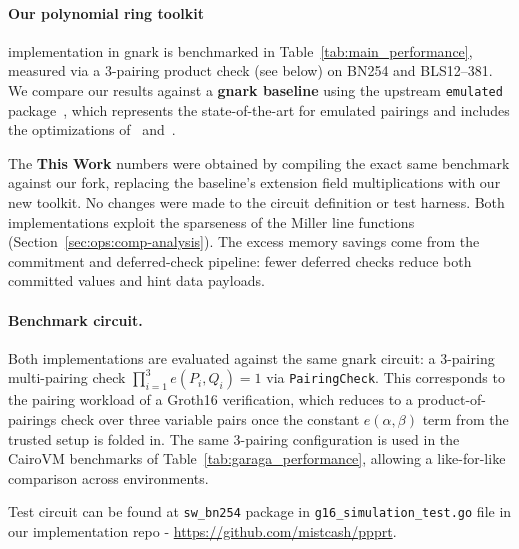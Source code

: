 \paragraph{Our polynomial ring toolkit} implementation in gnark is benchmarked in Table~\ref{tab:main_performance}, measured via a 3-pairing product check (see below) on BN254 and BLS12--381. We compare our results against a \textbf{gnark baseline} using the upstream \texttt{emulated} package~\cite{gnark}, which represents the state-of-the-art for emulated pairings and includes the optimizations of~\cite{ACNS:ElHousni23} and~\cite{EPRINT:NovEag24}.

The \textbf{This Work} numbers were obtained by compiling the exact same benchmark against our fork, replacing the baseline's extension field multiplications with our new toolkit. No changes were made to the circuit definition or test harness. Both implementations exploit the sparseness of the Miller line functions (Section~\ref{sec:ops:comp-analysis}). The excess memory savings come from the commitment and deferred-check pipeline: fewer deferred checks reduce both committed values and hint data payloads.

\paragraph{Benchmark circuit.}
\label{sec:bench-circuit}
Both implementations are evaluated against the same gnark circuit: a 3-pairing multi-pairing check $\prod_{i=1}^{3} e(P_i, Q_i) = 1$ via \texttt{PairingCheck}. This corresponds to the pairing workload of a Groth16 verification, which reduces to a product-of-pairings check over three variable pairs once the constant $e(\alpha, \beta)$ term from the trusted setup is folded in. The same 3-pairing configuration is used in the CairoVM benchmarks of Table~\ref{tab:garaga_performance}, allowing a like-for-like comparison across environments.

Test circuit can be found at \texttt{sw\_bn254} package in \texttt{g16\_simulation\_test.go} file in our implementation repo - \url{https://github.com/mistcash/ppprt}.

